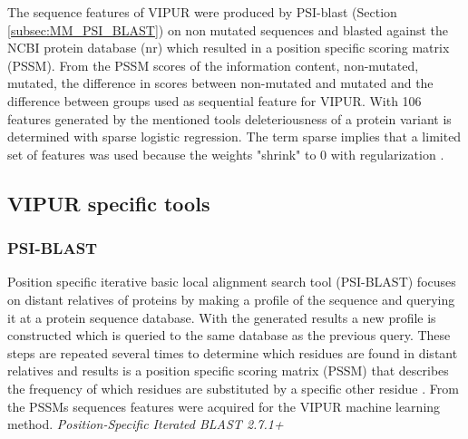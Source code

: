 The sequence features of VIPUR were produced by PSI-blast (Section \ref{subsec:MM_PSI_BLAST}) on non mutated sequences and blasted against the NCBI protein database (nr) which resulted in a position specific scoring matrix (PSSM). 
From the PSSM scores of the information content, non-mutated, mutated, the difference in scores between non-mutated and mutated and the difference between groups \cite{baugh_robust_2016, poultney_rational_2011} used as sequential feature for VIPUR.
With 106 features generated by the mentioned tools deleteriousness of a protein variant is determined with sparse logistic regression. The term sparse implies that a limited set of features was used because the weights "shrink" to 0 with regularization \cite{baugh_supplementary:_2016}.
\label{subsec:MM_VIPUR}

\subsection{VIPUR specific tools}

\subsubsection{PSI-BLAST}
Position specific iterative basic local alignment search tool (PSI-BLAST) focuses on distant relatives of proteins by making a profile of the sequence and querying it at a protein sequence database. With the generated results a new profile is constructed which is queried to the same database as the previous query. These steps are repeated several times to determine which residues are found in distant relatives and results is a position specific scoring matrix (PSSM) that describes the frequency of which residues are substituted by a specific other residue \cite{ncbi_psiblast_nodate,ncbi_pssm_nodate,wikipedia_blast_2019}.
From the PSSMs sequences features were acquired for the VIPUR machine learning method.
\label{subsec:MM_PSI_BLAST}
\newline
\textit{Position-Specific Iterated BLAST 2.7.1+}

